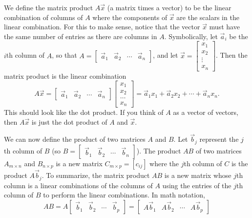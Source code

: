 We define the matrix product $A\vec x$ (a matrix times a vector) to be the linear combination of columns of $A$ where the components of $\vec x$ are the scalars in the linear combination. 
For this to make sense, notice that the vector $\vec x$ must have the same number of entries as there are columns in $A$. 
Symbolically, let $\vec a_i$ be the $i$th column of $A$, so that 
$A = \begin{bmatrix}\vec a_1 & \vec a_2 &\cdots &\vec a_n\end{bmatrix}$, 
and let $\vec x = \begin{bmatrix}x_1\\x_2\\ \vdots \\ x_n\end{bmatrix}$. Then the matrix product is the linear combination 
$$A\vec x 
=\begin{bmatrix}\vec a_1 & \vec a_2 &\cdots &\vec a_n\end{bmatrix}\begin{bmatrix}x_1\\x_2\\ \hdots \\ x_n\end{bmatrix}
= \vec a_1 x_1+\vec a_2 x_2+\cdots +\vec a_n x_n.$$ This should look like the dot product. If you think of $A$ as a vector of vectors, then $A\vec x$ is just the dot product of $A$ and $\vec x$.  

We can now define the product of two matrices $A$ and $B$.  
Let $\vec b_j$ represent the $j$th column of $B$ (so $B = \begin{bmatrix}\vec b_1 & \vec b_2 &\cdots &\vec b_n\end{bmatrix}$).  The product $AB$ of two matrices {$A_{m\times n}$} and {$B_{n\times p}$} is a new matrix {$C_{m\times p}=[c_{ij}]$} where the $j$th column of $C$ is the product $A\vec b_j$.  To summarize, the matrix product $AB$ is a new matrix whose $j$th column is a linear combinations of the columns of $A$ using the entries of the $j$th column of $B$ to perform the linear combinations.  In math notation,\begin{equation*}
AB 
=A\begin{bmatrix}\vec b_1 & \vec b_2 &\cdots &\vec b_p\end{bmatrix}=\begin{bmatrix}A\vec b_1 & A\vec b_2 &\cdots & A\vec b_p\end{bmatrix}
\end{equation*}


